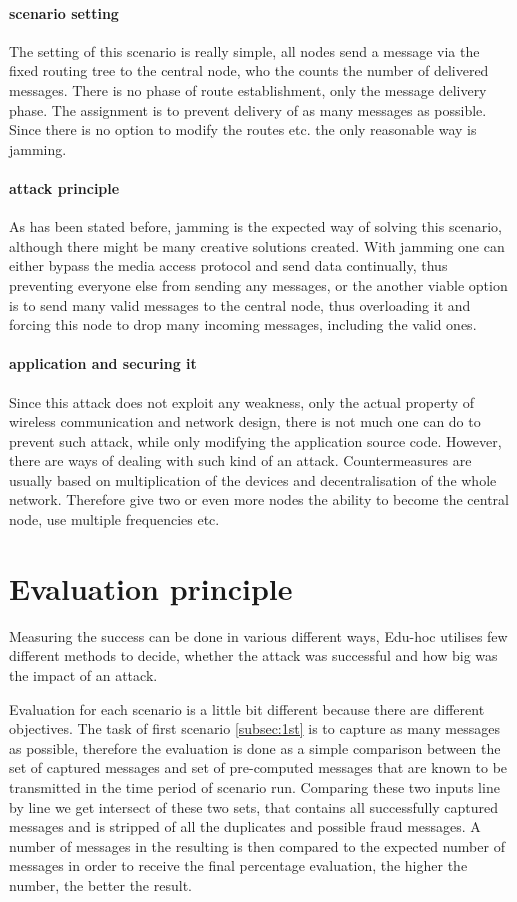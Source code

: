 \documentclass[
  digital, %
  table,   %
  nolof,     %
  nolot,     %
           oneside
]{fithesis3}
\begin{document}
    \paragraph{scenario setting}
    The setting of this scenario is really simple, all nodes send a message via the fixed routing tree to the central node, who the counts the number of delivered messages. There is no phase of route establishment, only the message delivery phase. The assignment is to prevent delivery of as many messages as possible. Since there is no option to modify the routes etc. the only reasonable way is jamming.

    \paragraph{attack principle}
    As has been stated before, jamming is the expected way of solving this scenario, although there might be many creative solutions created. With jamming one can either bypass the media access protocol and send data continually, thus preventing everyone else from sending any messages, or the another viable option is to send many valid messages to the central node, thus overloading it and forcing this node to drop many incoming messages, including the valid ones.

    \paragraph{application and securing it}
    Since this attack does not exploit any weakness, only the actual property of wireless communication and network design, there is not much one can do to prevent such attack, while only modifying the application source code. However, there are ways of dealing with such kind of an attack. Countermeasures are usually based on multiplication of the devices and decentralisation of the whole network. Therefore give two or even more nodes the ability to become the central node, use multiple frequencies etc. %

  \section{Evaluation principle}\label{sec:eval}
  Measuring the success can be done in various different ways, Edu-hoc utilises few different methods to decide, whether the attack was successful and how big was the impact of an attack.

  Evaluation for each scenario is a little bit different because there are different objectives. The task of first scenario \ref{subsec:1st} is to capture as many messages as possible, therefore the evaluation is done as a simple comparison between the set of captured messages and set of pre-computed messages that are known to be transmitted in the time period of scenario run. Comparing these two inputs line by line we get intersect of these two sets, that contains all successfully captured messages and is stripped of all the duplicates and possible fraud messages. A number of messages in the resulting is then compared to the expected number of messages in order to receive the final percentage evaluation, the higher the number, the better the result.
\end{document}
